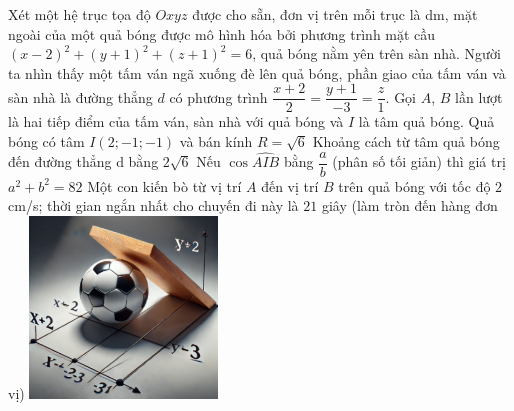 \begin{ex}
    \immini
    {
        Xét một hệ trục tọa độ $Oxyz$ được cho sẵn, đơn vị trên mỗi trục là dm, mặt ngoài của một quả bóng được mô hình hóa bởi phương trình mặt cầu $(x-2)^2+(y+1)^2+(z+1)^2=6$, quả bóng nằm yên trên sàn nhà. Người ta nhìn thấy một tấm ván ngã xuống đè lên quả bóng, phần giao của tấm ván và sàn nhà là đường thẳng $d$ có phương trình $\dfrac{x+2}{2}=\dfrac{y+1}{-3}=\dfrac{z}{1}$.  Gọi $A$, $B$ lần lượt là hai tiếp điểm của tấm ván, sàn nhà với quả bóng và $I$ là tâm quả bóng.
        \choiceTF
    {\True Quả bóng có tâm $I(2;-1;-1)$ và bán kính $R=\sqrt{6}$}
    {Khoảng cách từ tâm quả bóng đến đường thẳng d bằng $2\sqrt{6}$}
    {\True Nếu $\cos\widehat{AIB}$ bằng $\dfrac{a}{b}$ (phân số tối giản) thì giá trị $a^2+b^2=82$}
    {\True Một con kiến bò từ vị trí $A$ đến vị trí $B$ trên quả bóng với tốc độ $2$ cm/s; thời gian ngắn nhất cho chuyến đi này là $21$ giây (làm tròn đến hàng đơn vị)}
    }
    {
        \includegraphics[width=5cm]{img/HXN-3-14}
    }
\end{ex}
